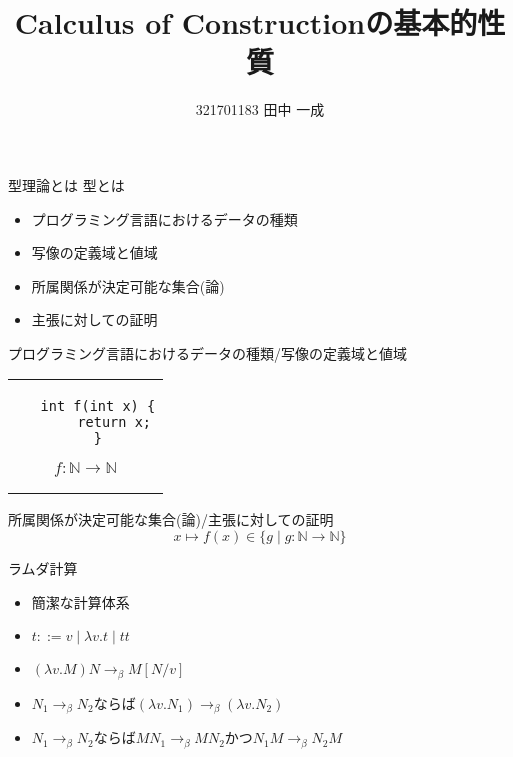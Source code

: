 \documentclass[18pt]{beamer}
\begin{document}
\title{Calculus of Constructionの基本的性質}
\author{321701183 田中 一成}


\frame{\maketitle}

\begin{frame}{型理論とは}
 型とは
 \begin{itemize}
  \item プログラミング言語におけるデータの種類
  \item 写像の定義域と値域
  \item 所属関係が決定可能な集合(論)
  \item 主張に対しての証明
 \end{itemize}
\end{frame}

\begin{frame}[fragile]{プログラミング言語におけるデータの種類/写像の定義域と値域}
\begin{tabular}{c}
 \begin{minipage}{0.5\textwidth}
  \begin{verbatim}
   int f(int x) {
       return x;
   }
  \end{verbatim}
 \end{minipage}
 \begin{minipage}{0.5\textwidth}
 \[
 f \colon \mathbb{N} \rightarrow \mathbb{N}
 \]
 \end{minipage}
\end{tabular}
\end{frame}

\begin{frame}[fragile]{所属関係が決定可能な集合(論)/主張に対しての証明}
 \[
 x \mapsto f (x) \in \{ g \mid g \colon \mathbb{N} \rightarrow \mathbb{N} \}
 \]
\begin{prooftree}
\end{prooftree}
\end{frame}

\begin{frame}{ラムダ計算}
 \begin{itemize}
  \item 簡潔な計算体系
  \item $t ::= v \mid \lambda v. t \mid t t$
  \item $(\lambda v. M) N \rightarrow_\beta M[N/v]$
  \item $N_1 \rightarrow_\beta N_2$ならば$(\lambda v. N_1) \rightarrow_\beta (\lambda v. N_2)$ \item $N_1 \rightarrow_\beta N_2$ならば$M N_1 \rightarrow_\beta M N_2$かつ$N_1 M \rightarrow_\beta N_2 M$
 \end{itemize}
\end{frame}
\end{document}
